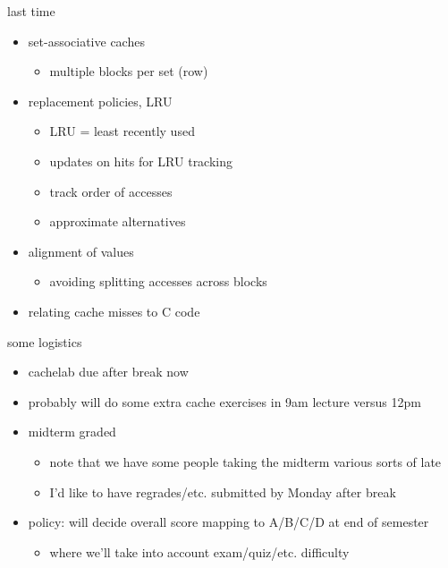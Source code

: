 \date{}
\title{}
\date{}

\begin{frame}
    \titlepage
\end{frame}



\usetikzlibrary{calc}

\begin{frame}{last time}
    \begin{itemize}
    \item set-associative caches
        \begin{itemize}
        \item multiple blocks per set (row)
        \end{itemize}
    \item replacement policies, LRU
        \begin{itemize}
        \item LRU = least recently used
        \item updates on hits for LRU tracking
        \item track order of accesses
        \item approximate alternatives
        \end{itemize}
    \item alignment of values
        \begin{itemize}
        \item avoiding splitting accesses across blocks
        \end{itemize}
    \item relating cache misses to C code
    \end{itemize}
\end{frame}

\begin{frame}{some logistics}
    \begin{itemize}
    \item cachelab due after break now 
    \item probably will do some extra cache exercises in 9am lecture versus 12pm
    \vspace{.5cm}
    \item midterm graded
        \begin{itemize}
        \item note that we have some people taking the midterm various sorts of late
        \item I'd like to have regrades/etc. submitted by Monday after break
        \end{itemize}
    \item policy: will decide overall score mapping to A/B/C/D at end of semester
        \begin{itemize}
        \item where we'll take into account exam/quiz/etc. difficulty
        \end{itemize}
    \end{itemize}
\end{frame}


